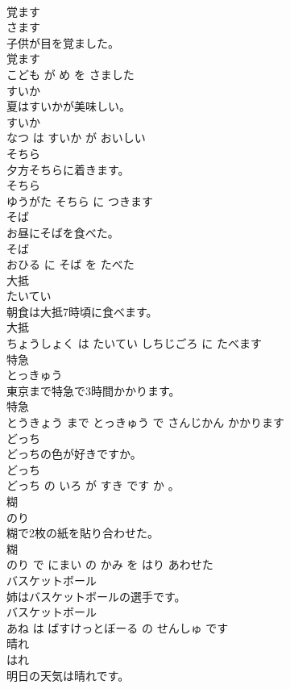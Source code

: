 \documentclass[8pt]{extreport}
\begin{document}
\begin{CJK}{UTF8}{min}
\\	覚ます	
\\	さます			
\\	子供が目を覚ました。	
\\	覚ます 
\\	こども が め を さました			
\\	すいか	
\\	夏はすいかが美味しい。	
\\	すいか 
\\	なつ は すいか が おいしい			
\\	そちら	
\\	夕方そちらに着きます。	
\\	そちら 
\\	ゆうがた そちら に つきます			
\\	そば	
\\	お昼にそばを食べた。	
\\	そば 
\\	おひる に そば を たべた			
\\	大抵	
\\	たいてい			
\\	朝食は大抵7時頃に食べます。	
\\	大抵 
\\	ちょうしょく は たいてい しちじごろ に たべます			
\\	特急	
\\	とっきゅう			
\\	東京まで特急で3時間かかります。	
\\	特急 
\\	とうきょう まで とっきゅう で さんじかん かかります			
\\	どっち	
\\	どっちの色が好きですか。	
\\	どっち 
\\	どっち の いろ が すき です か 。			
\\	糊	
\\	のり			
\\	糊で2枚の紙を貼り合わせた。	
\\	糊 
\\	のり で にまい の かみ を はり あわせた			
\\	バスケットボール	
\\	姉はバスケットボールの選手です。	
\\	バスケットボール 
\\	あね は ばすけっとぼーる の せんしゅ です			
\\	晴れ	
\\	はれ			
\\	明日の天気は晴れです。	

\end{CJK}
\end{document}
